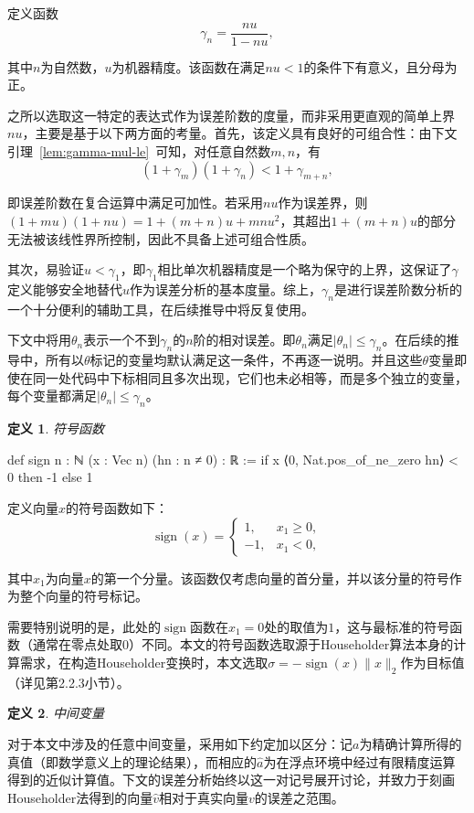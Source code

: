 ﻿\documentclass[UTF8,a4paper,openany]{ctexbook}
\DeclareMathOperator{\sign}{sign}
\theoremstyle{qrplain}
\newtheorem{definition}{定义}[chapter]
\begin{document}
定义函数
$$
\gamma_n = \frac{nu}{1-nu},
$$

其中$n$为自然数，$u$为机器精度。该函数在满足$nu<1$的条件下有意义，且分母为正。

之所以选取这一特定的表达式作为误差阶数的度量，而非采用更直观的简单上界$nu$，主要是基于以下两方面的考量。首先，该定义具有良好的可组合性：由下文引理~\ref{lem:gamma-mul-le}~可知，对任意自然数$m,n$，有
$$
(1+\gamma_m)(1+\gamma_n) < 1+\gamma_{m+n},
$$

即误差阶数在复合运算中满足可加性。若采用$nu$作为误差界，则$(1+mu)(1+nu)=1+(m+n)u+mnu^2$，其超出$1+(m+n)u$的部分无法被该线性界所控制，因此不具备上述可组合性质。

其次，易验证$u<\gamma_1$，即$\gamma_1$相比单次机器精度是一个略为保守的上界，这保证了$\gamma$定义能够安全地替代$u$作为误差分析的基本度量。综上，$\gamma_n$是进行误差阶数分析的一个十分便利的辅助工具，在后续推导中将反复使用。

下文中将用$\theta_n$表示一个不到$\gamma_n$的$n$阶的相对误差。即$\theta_n$满足$|\theta_n|\le\gamma_n$。在后续的推导中，所有以$\theta$标记的变量均默认满足这一条件，不再逐一说明。并且这些$\theta$变量即使在同一处代码中下标相同且多次出现，它们也未必相等，而是多个独立的变量，每个变量都满足$|\theta_n|\le\gamma_n$。

\begin{definition}
\label{def:sign}
  符号函数
\end{definition}
\begin{leancode}
  def sign {n : ℕ} (x : Vec n) (hn : n ≠ 0) : ℝ :=
    if x ⟨0, Nat.pos_of_ne_zero hn⟩ < 0 then -1 else 1
\end{leancode}

定义向量$x$的符号函数如下：
$$
\sign(x)=
\begin{cases}
1, & x_1 \ge 0, \\
-1, & x_1 < 0,
\end{cases}
$$

其中$x_1$为向量$x$的第一个分量。该函数仅考虑向量的首分量，并以该分量的符号作为整个向量的符号标记。

需要特别说明的是，此处的$\sign$函数在$x_1=0$处的取值为$1$，这与最标准的符号函数（通常在零点处取$0$）不同。本文的符号函数选取源于Householder算法本身的计算需求，在构造Householder变换时，本文选取$\sigma=-\sign(x)\|x\|_2$作为目标值（详见第2.2.3小节）。

\begin{definition}
  中间变量
\end{definition}
对于本文中涉及的任意中间变量，采用如下约定加以区分：记$a$为精确计算所得的真值（即数学意义上的理论结果），而相应的$\hat{a}$为在浮点环境中经过有限精度运算得到的近似计算值。下文的误差分析始终以这一对记号展开讨论，并致力于刻画Householder法得到的向量$\hat{v}$相对于真实向量$v$的误差之范围。
\end{document}
